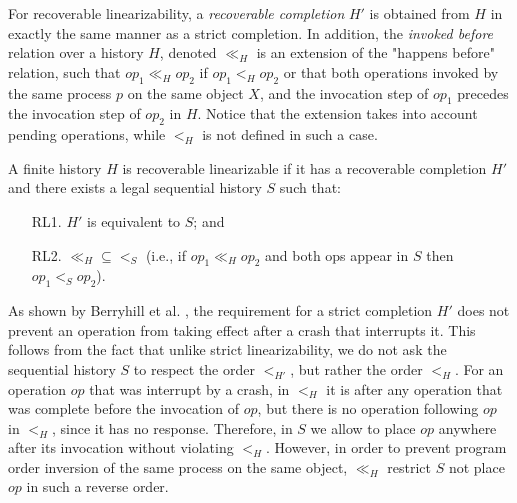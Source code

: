 For recoverable linearizability, a \textit{recoverable completion} $H'$ is obtained from $H$ in exactly the same manner as a strict completion. In addition, the \textit{invoked before} relation over a history $H$, denoted $\ll_H$ is an extension of the "happens before" relation, such that $op_1 \ll_H op_2$ if $op_1 <_H op_2$ or that both operations invoked by the same process $p$ on the same object $X$, and the invocation step of $op_1$ precedes the invocation step of $op_2$ in $H$. Notice that the extension takes into account pending operations, while $<_H$ is not defined in such a case.

\begin{definition} 
	\label{Definition: Recoverable linearizability}
	A finite history $H$ is recoverable linearizable if it has a recoverable completion $H'$ and there exists a legal sequential history $S$ such that:
	\begin{enumerate}
		\item [RL1.] $H'$ is equivalent to $S$; and
		\item [RL2.] $\ll_H \subseteq <_S$ (i.e., if $op_1 \ll_H op_2$ and both ops appear in $S$ then $op_1 <_S op_2$).
	\end{enumerate}
\end{definition}

As shown by Berryhill et al. \cite{DBLP:conf/opodis/BerryhillGT15}, the requirement for a strict completion $H'$ does not prevent an operation from taking effect after a crash that interrupts it. This follows from the fact that unlike strict linearizability, we do not ask the sequential history $S$ to respect the order $<_{H'}$, but rather the order $<_H$. For an operation $op$ that was interrupt by a crash, in $<_H$ it is after any operation that was complete before the invocation of $op$, but there is no operation following $op$ in $<_H$, since it has no response. Therefore, in $S$ we allow to place $op$ anywhere after its invocation without violating $<_H$. However, in order to prevent program order inversion of the same process on the same object, $\ll_H$ restrict $S$ not place $op$ in such a reverse order.



